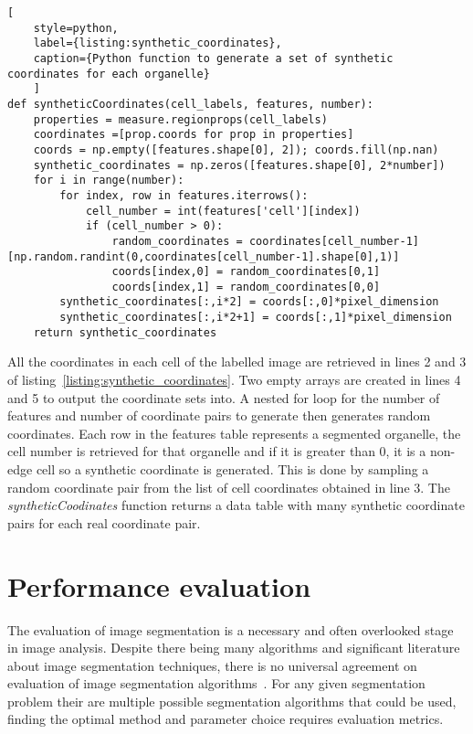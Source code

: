 \begin{lstlisting}[
	style=python,
	label={listing:synthetic_coordinates},
	caption={Python function to generate a set of synthetic coordinates for each organelle}
	]
def syntheticCoordinates(cell_labels, features, number):
    properties = measure.regionprops(cell_labels)
    coordinates =[prop.coords for prop in properties] 
    coords = np.empty([features.shape[0], 2]); coords.fill(np.nan)
    synthetic_coordinates = np.zeros([features.shape[0], 2*number])
    for i in range(number):
        for index, row in features.iterrows():
            cell_number = int(features['cell'][index])
            if (cell_number > 0):
                random_coordinates = coordinates[cell_number-1][np.random.randint(0,coordinates[cell_number-1].shape[0],1)]
                coords[index,0] = random_coordinates[0,1]
                coords[index,1] = random_coordinates[0,0]
        synthetic_coordinates[:,i*2] = coords[:,0]*pixel_dimension
        synthetic_coordinates[:,i*2+1] = coords[:,1]*pixel_dimension
    return synthetic_coordinates
\end{lstlisting}

All the coordinates in each cell of the labelled image are retrieved in lines 2 and 3 of listing~\ref{listing:synthetic_coordinates}. Two empty arrays are created in lines 4 and 5 to output the coordinate sets into. A nested for loop for the number of features and number of coordinate pairs to generate then generates random coordinates. Each row in the features table represents a segmented organelle, the cell number is retrieved for that organelle and if it is greater than 0, it is a non-edge cell so a synthetic coordinate is generated. This is done by sampling a random coordinate pair from the list of cell coordinates obtained in line 3. The \emph{syntheticCoodinates} function returns a data table with many synthetic coordinate pairs for each real coordinate pair.

\section{Performance evaluation}
\label{endothelial_morphometry:performance_evaluation}
The evaluation of image segmentation is a necessary and often overlooked stage in image analysis. Despite there being many algorithms and significant literature about image segmentation techniques, there is no universal agreement on evaluation of image segmentation algorithms~\cite{Benes2015}. For any given segmentation problem their are multiple possible segmentation algorithms that could be used, finding the optimal method and parameter choice requires evaluation metrics.

